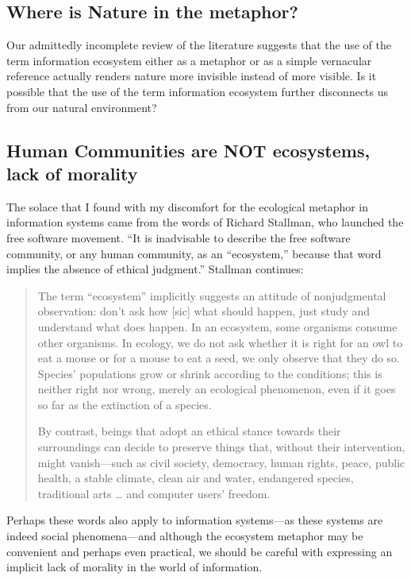 \subsection{Where is Nature in the metaphor?}

Our admittedly incomplete review of the literature suggests that the use of the term information ecosystem either as a metaphor or as a simple vernacular reference actually renders nature more invisible instead of more visible. Is it possible that the use of the term information ecosystem further disconnects us from our natural environment? \cite[cf. ][]{worthy_2013}

\subsection{Human Communities are NOT ecosystems, lack of morality}

The solace that I found with my discomfort for the ecological metaphor in information systems came from the words of Richard Stallman, who launched the free software movement. “It is inadvisable to describe the free software community, or any human community, as an “ecosystem,” because that word implies the absence of ethical judgment.”  Stallman continues:
 
\begin{quote}
The term “ecosystem” implicitly suggests an attitude of nonjudgmental observation: don't ask how [sic] what should happen, just study and understand what does happen. In an ecosystem, some organisms consume other organisms. In ecology, we do not ask whether it is right for an owl to eat a mouse or for a mouse to eat a seed, we only observe that they do so. Species' populations grow or shrink according to the conditions; this is neither right nor wrong, merely an ecological phenomenon, even if it goes so far as the extinction of a species.

By contrast, beings that adopt an ethical stance towards their surroundings can decide to preserve things that, without their intervention, might vanish—such as civil society, democracy, human rights, peace, public health, a stable climate, clean air and water, endangered species, traditional arts … and computer users' freedom. \cite{fsf_2014}
\end{quote}

Perhaps these words also apply to information systems—as these systems are indeed social phenomena—and although the ecosystem metaphor may be convenient and perhaps even practical, we should be careful with expressing an implicit lack of morality in the world of information.


